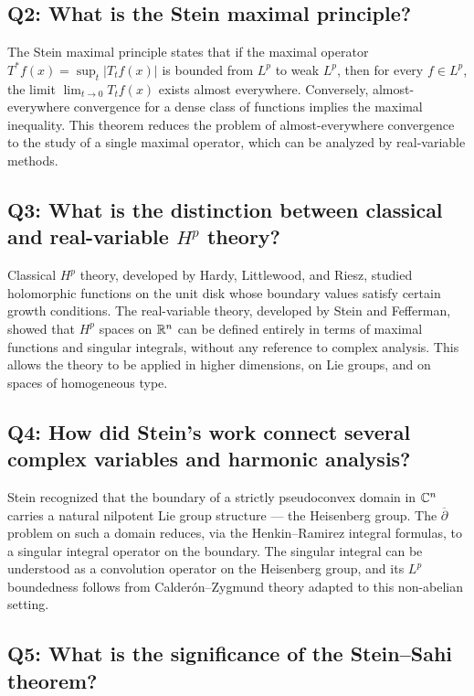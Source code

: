\subsection*{Q2: What is the Stein maximal principle?}

The Stein maximal principle states that if the maximal operator \(T^*f(x) = \sup_t |T_t f(x)|\) is bounded from \(L^p\) to weak \(L^p\), then for every \(f \in L^p\), the limit \(\lim_{t\to 0} T_t f(x)\) exists almost everywhere. Conversely, almost-everywhere convergence for a dense class of functions implies the maximal inequality. This theorem reduces the problem of almost-everywhere convergence to the study of a single maximal operator, which can be analyzed by real-variable methods.

\subsection*{Q3: What is the distinction between classical and real-variable \(H^p\) theory?}

Classical \(H^p\) theory, developed by Hardy, Littlewood, and Riesz, studied holomorphic functions on the unit disk whose boundary values satisfy certain growth conditions. The real-variable theory, developed by Stein and Fefferman, showed that \(H^p\) spaces on \(\mathbb{R}^n\) can be defined entirely in terms of maximal functions and singular integrals, without any reference to complex analysis. This allows the theory to be applied in higher dimensions, on Lie groups, and on spaces of homogeneous type.

\subsection*{Q4: How did Stein's work connect several complex variables and harmonic analysis?}

Stein recognized that the boundary of a strictly pseudoconvex domain in \(\mathbb{C}^n\) carries a natural nilpotent Lie group structure --- the Heisenberg group. The \(\overline{\partial}\) problem on such a domain reduces, via the Henkin--Ramirez integral formulas, to a singular integral operator on the boundary. The singular integral can be understood as a convolution operator on the Heisenberg group, and its \(L^p\) boundedness follows from Calder\'on--Zygmund theory adapted to this non-abelian setting.

\subsection*{Q5: What is the significance of the Stein--Sahi theorem?}

